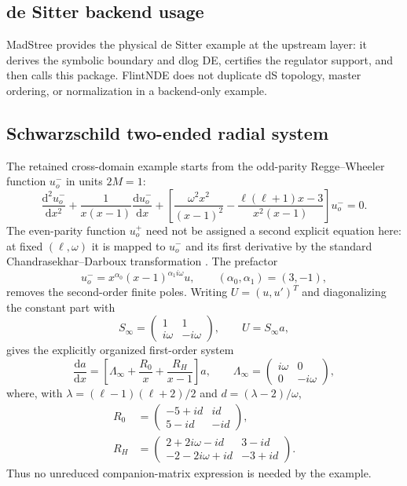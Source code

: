 \documentclass[11pt]{article}
\newcommand{\dd}{\mathrm d}
\renewcommand{\_}{\origunderscore\allowbreak}
\begin{document}
\subsection{de Sitter backend usage}

MadStree provides the physical de Sitter example at the upstream layer: it derives the symbolic
boundary and dlog DE, certifies the regulator support, and then calls this package.  FlintNDE does
not duplicate dS topology, master ordering, or normalization in a backend-only example.

\subsection{Schwarzschild two-ended radial system}
\label{subsec:qnm-example}

The retained cross-domain example starts from the odd-parity Regge--Wheeler function
$u^-_o$ in units $2M=1$:
\begin{equation}
 \frac{\dd^2u^-_o}{\dd x^2}
 +\frac{1}{x(x-1)}\frac{\dd u^-_o}{\dd x}
 +\left[\frac{\omega^2x^2}{(x-1)^2}
 -\frac{\ell(\ell+1)x-3}{x^2(x-1)}\right]u^-_o=0.
 \label{eq:qnm-original-rw}
\end{equation}
The even-parity function $u^+_o$ need not be assigned a second explicit equation here: at
fixed $(\ell,\omega)$ it is mapped to $u^-_o$ and its first derivative by the standard
Chandrasekhar--Darboux transformation \cite{Glampedakis:2017rar}.  The prefactor
\begin{equation}
 u^-_o=x^{\alpha_0}(x-1)^{\alpha_1 i\omega}u,
 \qquad (\alpha_0,\alpha_1)=(3,-1),
 \label{eq:qnm-u-transform}
\end{equation}
removes the second-order finite poles.  Writing $U=(u,u')^T$ and diagonalizing the constant
part with
\begin{equation}
 S_\infty=\begin{pmatrix}1&1\\ i\omega&-i\omega\end{pmatrix},
 \qquad U=S_\infty a,
\end{equation}
gives the explicitly organized first-order system
\begin{equation}
 \frac{\dd a}{\dd x}=\left[\Lambda_\infty+
 \frac{R_0}{x}+\frac{R_H}{x-1}\right]a,
 \qquad \Lambda_\infty=\begin{pmatrix}i\omega&0\\0&-i\omega\end{pmatrix},
 \label{eq:qnm-diagonal-system}
\end{equation}
where, with $\lambda=(\ell-1)(\ell+2)/2$ and $d=(\lambda-2)/\omega$,
\begin{align}
 R_0&=\begin{pmatrix}-5+id&id\\5-id&-id\end{pmatrix},\\
 R_H&=\begin{pmatrix}2+2i\omega-id&3-id\\-2-2i\omega+id&-3+id\end{pmatrix}.
 \label{eq:qnm-residue-matrices}
\end{align}
Thus no unreduced companion-matrix expression is needed by the example.
\end{document}

